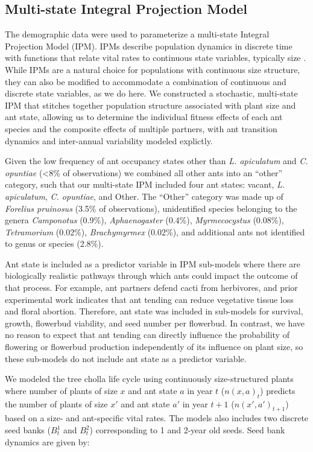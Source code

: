 \documentclass[11pt]{article}
\begin{document}
\subsection*{Multi-state Integral Projection Model}
The demographic data were used to parameterize a multi-state Integral Projection Model (IPM).
IPMs describe population dynamics in discrete time with functions that relate vital rates to continuous state variables, typically size \citep{ellnerbook}. 
While IPMs are a natural choice for populations with continuous size structure, they can also be modified to accommodate a combination of continuous and discrete state variables, as we do here. 
We constructed a stochastic, multi-state IPM that stitches together population structure associated with plant size and ant state, allowing us to determine the individual fitness effects of each ant species and the composite effects of multiple partners, with ant transition dynamics and inter-annual variability modeled explictly. 

Given the low frequency of ant occupancy states other than \textit{L. apiculatum} and \textit{C. opuntiae} (\textless8\% of observations) we combined all other ants into an ``other'' category, such that our multi-state IPM included four ant states: vacant, \textit{L. apiculatum}, \textit{C. opuntiae}, and Other. 
The ``Other'' category was made up of \textit{Forelius pruinosus} (3.5\% of observations), unidentified species belonging to the genera \textit{Camponotus} (0.9\%), \textit{Aphaenogaster} (0.4\%), \textit{Myrmecocystus} (0.08\%), \textit{Tetramorium} (0.02\%), \textit{Brachymyrmex} (0.02\%), and additional ants not identified to genus or species (2.8\%). 

Ant state is included as a predictor variable in IPM sub-models where there are biologically realistic pathways through which ants could impact the outcome of that process. 
For example, ant partners defend cacti from herbivores, and prior experimental work indicates that ant tending can reduce vegetative tissue loss and floral abortion.
Therefore, ant state was included in sub-models for survival, growth, flowerbud viability, and seed number per flowerbud. 
In contrast, we have no reason to expect that ant tending can directly influence the probability of flowering or flowerbud production independently of its influence on plant size, so these sub-models do not include ant state as a predictor variable. 

We modeled the tree cholla life cycle using continuously size-structured plants where number of plants of size $x$  and ant state $a$ in year $t$ ($n(x,a)_{t}$) predicts the number of plants of size $x'$ and ant state $a'$ in year $t+1$ ($n(x',a')_{t+1}$) based on a size- and ant-specific vital rates. 
The models also includes two discrete seed banks ($B^1_{t}$ and $B^2_{t}$) corresponding to 1 and 2-year old seeds. 
Seed bank dynamics are given by:
\end{document}
